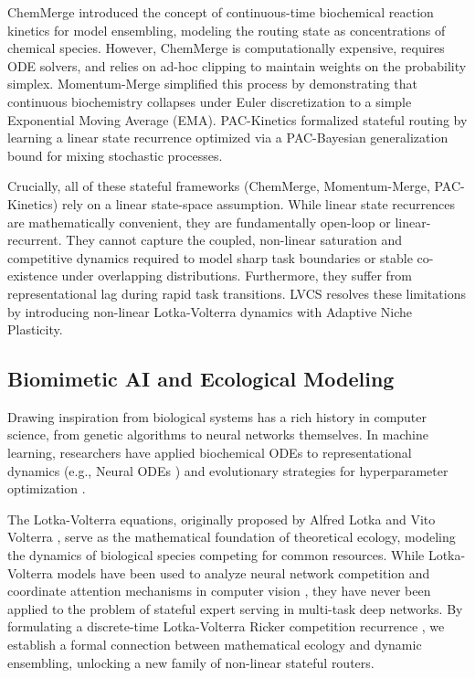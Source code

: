 ChemMerge \cite{chemmerge} introduced the concept of continuous-time biochemical reaction kinetics for model ensembling, modeling the routing state as concentrations of chemical species. However, ChemMerge is computationally expensive, requires ODE solvers, and relies on ad-hoc clipping to maintain weights on the probability simplex. Momentum-Merge \cite{momentummerge} simplified this process by demonstrating that continuous biochemistry collapses under Euler discretization to a simple Exponential Moving Average (EMA). PAC-Kinetics \cite{packinetics} formalized stateful routing by learning a linear state recurrence optimized via a PAC-Bayesian generalization bound for mixing stochastic processes.

Crucially, all of these stateful frameworks (ChemMerge, Momentum-Merge, PAC-Kinetics) rely on a linear state-space assumption. While linear state recurrences are mathematically convenient, they are fundamentally open-loop or linear-recurrent. They cannot capture the coupled, non-linear saturation and competitive dynamics required to model sharp task boundaries or stable co-existence under overlapping distributions. Furthermore, they suffer from representational lag during rapid task transitions. LVCS resolves these limitations by introducing non-linear Lotka-Volterra dynamics with Adaptive Niche Plasticity.

\subsection{Biomimetic AI and Ecological Modeling}
Drawing inspiration from biological systems has a rich history in computer science, from genetic algorithms \cite{holland1992adaptation} to neural networks themselves. In machine learning, researchers have applied biochemical ODEs to representational dynamics (e.g., Neural ODEs \cite{chen2018neural}) and evolutionary strategies for hyperparameter optimization \cite{jaderberg2017population}.

The Lotka-Volterra equations, originally proposed by Alfred Lotka \cite{lotka1925physical} and Vito Volterra \cite{volterra1926fluctuations}, serve as the mathematical foundation of theoretical ecology, modeling the dynamics of biological species competing for common resources. While Lotka-Volterra models have been used to analyze neural network competition \cite{fukushima1980neocognitron} and coordinate attention mechanisms in computer vision \cite{carandini2012normalization}, they have never been applied to the problem of stateful expert serving in multi-task deep networks. By formulating a discrete-time Lotka-Volterra Ricker competition recurrence \cite{ricker1954stock, may1976simple}, we establish a formal connection between mathematical ecology and dynamic ensembling, unlocking a new family of non-linear stateful routers.
